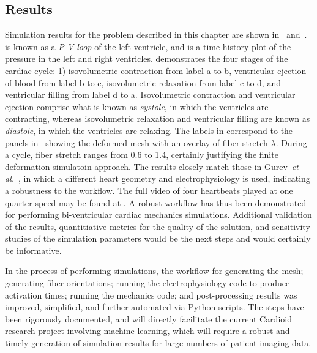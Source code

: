\subsection{Results}
\label{Results}

Simulation results for the problem described in this chapter are shown in~ and~.  is known as a \textit{P-V loop} of the left ventricle, and  is a time history plot of the pressure in the left and right ventricles.  demonstrates the four stages of the cardiac cycle: 1) isovolumetric contraction from label a to b, ventricular ejection of blood from label b to c, isovolumetric relaxation from label c to d, and ventricular filling from label d to a. Isovolumetric contraction and ventricular ejection comprise what is known as \textit{systole}, in which the ventricles are contracting, whereas isovolumetric relaxation and ventricular filling are known as \textit{diastole}, in which the ventricles are relaxing. The labels in  correspond to the panels in~ showing the deformed mesh with an overlay of fiber stretch $\lambda$. During a cycle, fiber stretch ranges from 0.6 to 1.4, certainly justifying the finite deformation simulatoin approach. The results closely match those in Gurev~\textit{et al.}~\cite{gurev_2015}, in which a different heart geometry and electrophysiology is used, indicating a robustness to the workflow. The full video of four heartbeats played at one quarter speed may be found at \href{youtu.be/RtQKEjdR4MU}. A robust workflow has thus been demonstrated for performing bi-ventricular cardiac mechanics simulations. Additional validation of the results, quantitiative metrics for the quality of the solution, and sensitivity studies of the simulation parameters would be the next steps and would certainly be informative.

In the process of performing simulations, the workflow for generating the mesh; generating fiber orientations; running the electrophysiology code to produce activation times; running the mechanics code; and post-processing results was improved, simplified, and further automated via Python scripts. The steps have been rigorously documented, and will directly facilitate the current Cardioid research project involving machine learning, which will require a robust and timely generation of simulation results for large numbers of patient imaging data.

